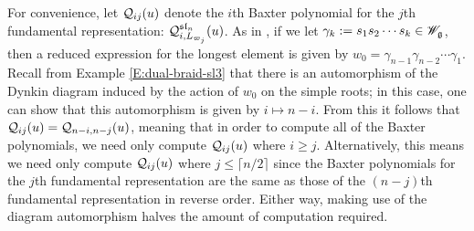 For convenience, let $\mathcal{Q}_{ij}(u)$ denote the $i$th Baxter polynomial for the $j$th fundamental representation: $\mathcal{Q}_{i,L_{\varpi_j}}^{\mathfrak{sl}_n}(u)$.
As in \cite[\S 6]{chari_braid_2002}, if we let $\gamma_k := s_1s_2\cdots s_k\in\mathscr{W}_{\mathfrak{g}}$, then a reduced expression for the longest element is given by $w_0 = \gamma_{n-1}\gamma_{n-2}\cdots\gamma_1$.
Recall from Example \ref{E:dual-braid-sl3} that there is an automorphism of the Dynkin diagram induced by the action of $w_0$ on the simple roots; in this case, one can show that this automorphism is given by $i\mapsto n-i$.
From this it follows that $\mathcal{Q}_{ij}(u) = \mathcal{Q}_{n-i,n-j}(u)$, meaning that in order to compute all of the Baxter polynomials, we need only compute $\mathcal{Q}_{ij}(u)$ where $i\geq j$.
Alternatively, this means we need only compute $\mathcal{Q}_{ij}(u)$ where $j\leq\lceil n/2 \rceil$ since the Baxter polynomials for the $j$th fundamental representation are the same as those of the $(n-j)$th fundamental representation in reverse order.
Either way, making use of the diagram automorphism halves the amount of computation required.

